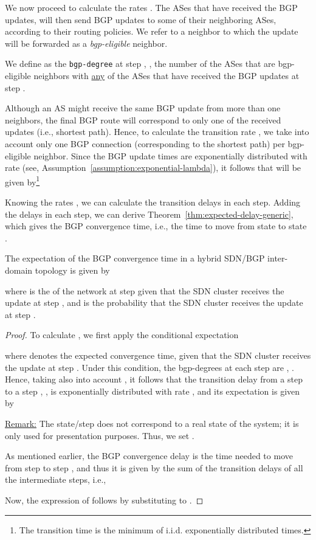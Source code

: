 We now proceed to calculate the rates . 
The ASes that have received the BGP updates, will then send BGP updates to some of their neighboring ASes, according to their routing policies. We refer to a neighbor to which the update will be forwarded as a \textit{bgp-eligible} neighbor. 

\begin{definition}\label{def:bgp-degree}
We define as the \texttt{bgp-degree} at step , , the number of the ASes that are bgp-eligible neighbors with \underline{any} of the ASes that have received the BGP updates at step . 
\end{definition}

Although an AS might receive the same BGP update from more than one neighbors, the final BGP route will correspond to only one of the received updates (i.e., shortest path). Hence, to calculate the transition rate , we take into account only one BGP connection (corresponding to the shortest path) per bgp-eligible neighbor. Since the BGP update times are exponentially distributed with rate  (see, Assumption~\ref{assumption:exponential-lambda}), it follows that  will be given by\footnote{The transition time is the minimum of  i.i.d. exponentially distributed times.}


Knowing the rates , we can calculate the transition delays in each step. Adding the delays in each step, we can derive Theorem~\ref{thm:expected-delay-generic}, which gives the BGP convergence time, i.e., the time to move from state  to state . 



\begin{theorem}\label{thm:expected-delay-generic}
The expectation of the BGP convergence time  in a hybrid SDN/BGP inter-domain topology is given by

where  is the \bgp of the network at step  given that the SDN cluster receives the update at step , and  is the probability that the SDN cluster receives the update at step .
\end{theorem}
\begin{proof}
To calculate , we first apply the conditional expectation

where  denotes the expected convergence time, given that the SDN cluster receives the update at step . Under this condition, the bgp-degrees at each step are , . Hence, taking also into account , it follows that the transition delay from a step  to a step , , is exponentially distributed with rate , and its expectation is given by

\underline{Remark:} The state/step  does not correspond to a real state of the system; it is only used for presentation purposes. Thus, we set .

As mentioned earlier, the BGP convergence delay is the time needed to move from step  to step , and thus it is given by the sum of the transition delays of all the intermediate steps, i.e., 

Now, the expression of  follows by substituting  to .
\end{proof}


